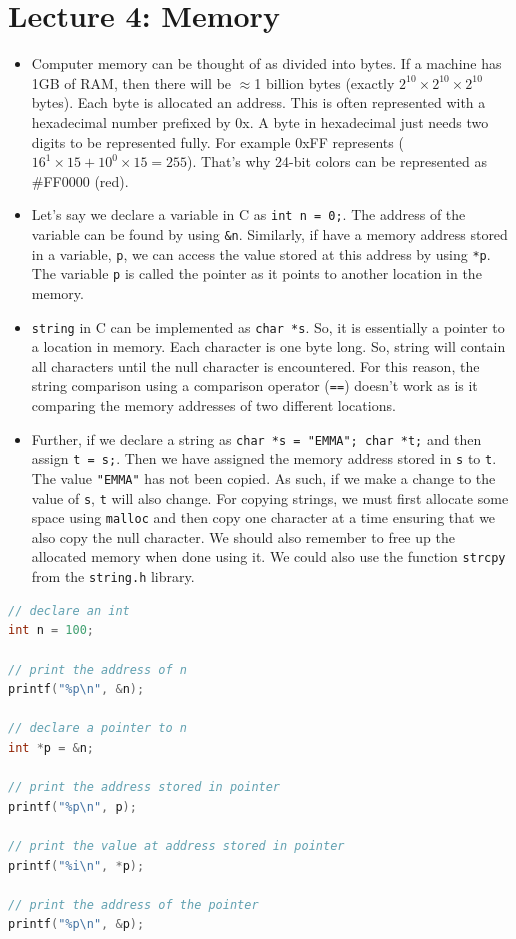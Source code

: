 \documentclass[11pt]{article}
\begin{document}
\section*{Lecture 4: Memory}
\begin{itemize}
	\item Computer memory can be thought of as divided into bytes. If a machine has 1GB of RAM, then there will be $\approx$1 billion bytes (exactly $2^{10}\times2^{10}\times2^{10}$ bytes). Each byte is allocated an address. This is often represented with a hexadecimal number prefixed by 0x. A byte in hexadecimal just needs two digits to be represented fully. For example 0xFF represents ($16^1\times15 + 10^0\times15=255$). That's why 24-bit colors can be represented as \#FF0000 (red). 
	\item Let's say we declare a variable in C as \texttt{int n = 0;}. The address of the variable can be found by using \texttt{\&n}. Similarly, if have a memory address stored in a variable, \texttt{p}, we can access the value stored at this address by using \texttt{*p}. The variable \texttt{p} is called the pointer as it points to another location in the memory. 
	\item \texttt{string} in C can be implemented as \texttt{char *s}. So, it is essentially a pointer to a location in memory. Each character is one byte long. So, string will contain all characters until the null character is encountered. For this reason, the string comparison using a comparison operator (\texttt{==}) doesn't work as is it comparing the memory addresses of two different locations. 
	\item Further, if we declare a string as \texttt{char *s = "EMMA"; char *t;} and then assign \texttt{t = s;}. Then we have assigned the memory address stored in \texttt{s} to \texttt{t}. The value \texttt{"EMMA"} has not been copied. As such, if we make a change to the value of \texttt{s}, \texttt{t} will also change. For copying strings, we must first allocate some space using \texttt{malloc} and then copy one character at a time ensuring that we also copy the null character. We should also remember to free up the allocated memory when done using it. We could also use the function \texttt{strcpy} from the \texttt{string.h} library. 
\end{itemize}

\begin{lstlisting}[language=C]
// declare an int
int n = 100;

// print the address of n
printf("%p\n", &n);

// declare a pointer to n
int *p = &n;

// print the address stored in pointer
printf("%p\n", p);

// print the value at address stored in pointer
printf("%i\n", *p);

// print the address of the pointer
printf("%p\n", &p);
\end{lstlisting}
\end{document}
